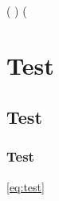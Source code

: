 \documentclass{article}
\begin{document}
\alpha \beta \gamma \delta
\forall \exists \partial \infty
\int \iint \iiint \oint
\to \leftarrow \rightarrow \leftrightarrow
\Leftarrow \Rightarrow \Leftrightarrow
{}    
  
\in \notin \subset \supset \cup \cap
\ll \\

\left( \right)   \bigg(

\section{Test} \subsection{Test} \subsubsection{Test}
\begin{equation} \end{equation}
\cite{reference} \label{eq:test} \ref{eq:test}
\end{document}
